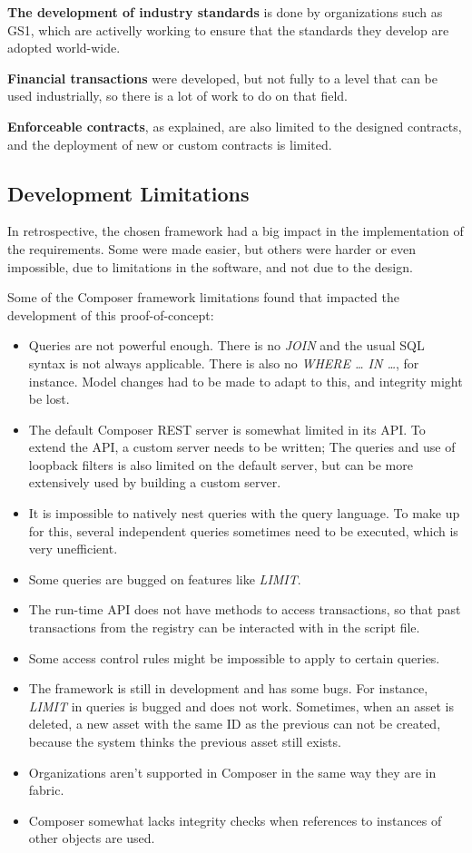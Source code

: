\textbf{The development of industry standards} is done by organizations such as GS1, which are activelly working to ensure that the standards they develop are adopted world-wide.

\textbf{Financial transactions} were developed, but not fully to a level that can be used industrially, so there is a lot of work to do on that field.

\textbf{Enforceable contracts}, as explained, are also limited to the designed contracts, and the deployment of new or custom contracts is limited.


\subsection{Development Limitations}

In retrospective, the chosen framework had a big impact in the implementation of the requirements. Some were made easier, but others were harder or even impossible, due to limitations in the software, and not due to the design.

Some of the Composer framework limitations found that impacted the development of this proof-of-concept:
\begin{itemize}
	\item  Queries are not powerful enough. There is no \textit{JOIN} and the usual SQL syntax is not always applicable. There is also no \textit{WHERE … IN …}, for instance. Model changes had to be made to adapt to this, and integrity might be lost.
	\item The default Composer REST server is somewhat limited in its API. To extend the API, a custom server needs to be written; The queries and use of loopback filters is also limited on the default server, but can be more extensively used by building a custom server.
	\item It is impossible to natively nest queries with the query language. To make up for this, several independent queries sometimes need to be executed, which is very unefficient.
	\item Some queries are bugged on features like \textit{LIMIT}.
	\item The run-time API does not have methods to access transactions, so that past transactions from the registry can be interacted with in the script file.
	\item Some access control rules might be impossible to apply to certain queries. 
	\item The framework is still in development and has some bugs. For instance, \textit{LIMIT} in queries is bugged and does not work. Sometimes, when an asset is deleted, a new asset with the same ID as the previous can not be created, because the system thinks the previous asset still exists.
	\item Organizations aren't supported in Composer in the same way they are in fabric.
	\item Composer somewhat lacks integrity checks when references to instances of other objects are used.
\end{itemize}
